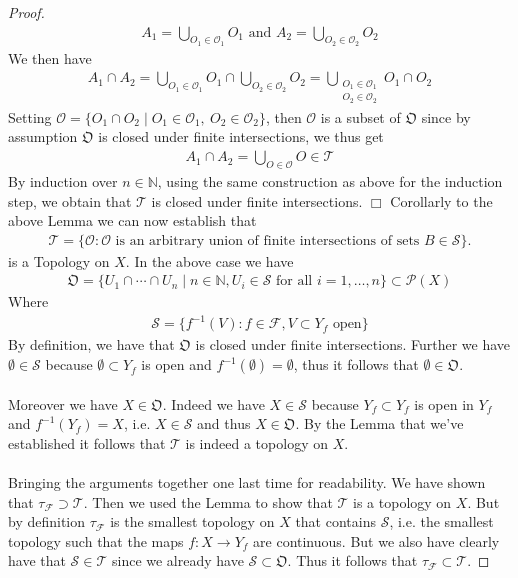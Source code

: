 \documentclass[12pt,a4paper]{article}
\begin{document}
\begin{proof}
\begin{align*}
A_1 = \bigcup_{O_1 \in \mathcal{O}_1} O_1  \text{ and } A_2 = \bigcup_{O_2 \in \mathcal{O}_2} O_2 
\end{align*} 
We then have
\begin{align*}
A_1 \cap A_2  =\bigcup_{O_1 \in \mathcal{O}_1} O_1 \cap \bigcup_{O_2 \in \mathcal{O}_2} O_2 = \bigcup_{ \substack{ O_1 \in \mathcal{O}_1 \\ O_2 \in \mathcal{O}_2}} O_1 \cap O_2 
\end{align*}
Setting $\mathcal{O}= \lbrace O_1 \cap O_2 \mid O_1 \in \mathcal{O}_1, \ O_2 \in \mathcal{O}_2 \rbrace$, then $\mathcal{O}$ is a subset of $\mathfrak{O}$ since by assumption $\mathfrak{O}$ is closed under finite intersections, we thus get
\begin{align*}
A_1 \cap A_2 = \bigcup_{O \in \mathcal{O}} O \in \mathcal{T}
\end{align*}
By induction over $n \in \mathbb{N}$, using the same construction as above for the induction step, we obtain that $\mathcal{T}$ is closed under finite intersections. \hfill $\Box$
\newpage
Corollarly to the above Lemma we can now establish that 
\begin{align*}
\mathcal{T}=\lbrace \mathcal{O}: \mathcal{O} \text{ is an arbitrary union of finite intersections of sets } B \in \mathcal{S} \rbrace. 
\end{align*}
is a Topology on $X$. In the above case we have
\begin{align*}
\mathfrak{O}= \lbrace  U_1 \cap \cdots \cap U_n \mid n \in \mathbb{N}, U_i \in \mathcal{S} \text{ for all } i=1, \dots ,n \rbrace \subset \mathcal{P}(X)
\end{align*}
Where
\begin{align*}
\mathcal{S}= \lbrace f^{-1}(V): f \in \mathcal{F}, V \subset Y_f \text{ open} \rbrace 
\end{align*}
By definition, we have that $\mathfrak{O}$ is closed under finite intersections. Further we have $\emptyset \in \mathcal{S}$ because $\emptyset \subset Y_f$ is open and $f^{-1}(\emptyset)=\emptyset$, thus it follows that $\emptyset \in \mathfrak{O}$. 
\\\\
Moreover we have $X \in \mathfrak{O}$. Indeed we have $X \in \mathcal{S}$ because $Y_f \subset Y_f$ is open in $Y_f$ and $f^{-1}(Y_f)=X$, i.e. $X \in \mathcal{S}$ and thus $X \in \mathfrak{O}.$ By the Lemma that we've established it follows that $\mathcal{T}$ is indeed a topology on $X$.
\\\\
Bringing the arguments together one last time for readability. We have shown that $\tau_\mathcal{F} \supset \mathcal{T}$. Then we used the Lemma to show that $\mathcal{T}$ is a topology on $X$. But by definition $\tau_\mathcal{F}$ is the smallest topology on $X$ that contains $\mathcal{S}$, i.e. the smallest topology such that the maps $f:X \to Y_f$ are continuous. But we also have clearly have that $\mathcal{S} \in \mathcal{T}$ since we already have $\mathcal{S} \subset \mathfrak{O}$. Thus it follows that $\tau_\mathcal{F} \subset \mathcal{T}$. 
\end{proof}
\newpage
\end{document}
